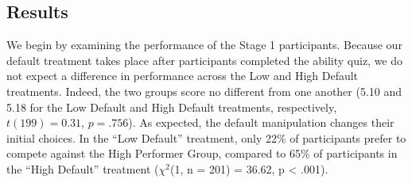 \documentclass[
  man,
  floatsintext,
  longtable,
  nolmodern,
  notxfonts,
  notimes,
  colorlinks=true,linkcolor=blue,citecolor=blue,urlcolor=blue]{apa7}
\begin{document}
\subsection{Results}\label{results}

We begin by examining the performance of the Stage 1 participants.
Because our default treatment takes place after participants completed
the ability quiz, we do not expect a difference in performance across
the Low and High Default treatments. Indeed, the two groups score no
different from one another (5.10 and 5.18 for the Low Default and High
Default treatments, respectively, \(t(199) = 0.31\), \(p = .756\)). As
expected, the default manipulation changes their initial choices. In the
``Low Default'' treatment, only 22\% of participants prefer to compete
against the High Performer Group, compared to 65\% of participants in
the ``High Default'' treatment (\(\chi^2\)(1, n = 201) = 36.62, p
\textless{} .001).

\linespread{1}
\end{document}
